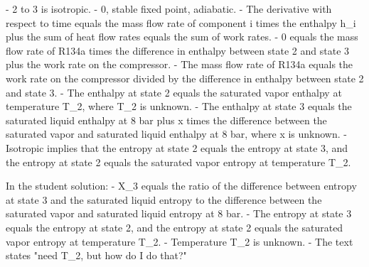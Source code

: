 - 2 to 3 is isotropic.
- 0, stable fixed point, adiabatic.
- The derivative with respect to time equals the mass flow rate of component i times the enthalpy h_i plus the sum of heat flow rates equals the sum of work rates.
- 0 equals the mass flow rate of R134a times the difference in enthalpy between state 2 and state 3 plus the work rate on the compressor.
- The mass flow rate of R134a equals the work rate on the compressor divided by the difference in enthalpy between state 2 and state 3.
- The enthalpy at state 2 equals the saturated vapor enthalpy at temperature T_2, where T_2 is unknown.
- The enthalpy at state 3 equals the saturated liquid enthalpy at 8 bar plus x times the difference between the saturated vapor and saturated liquid enthalpy at 8 bar, where x is unknown.
- Isotropic implies that the entropy at state 2 equals the entropy at state 3, and the entropy at state 2 equals the saturated vapor entropy at temperature T_2.

In the student solution:
- X_3 equals the ratio of the difference between entropy at state 3 and the saturated liquid entropy to the difference between the saturated vapor and saturated liquid entropy at 8 bar.
- The entropy at state 3 equals the entropy at state 2, and the entropy at state 2 equals the saturated vapor entropy at temperature T_2.
- Temperature T_2 is unknown.
- The text states "need T_2, but how do I do that?"
